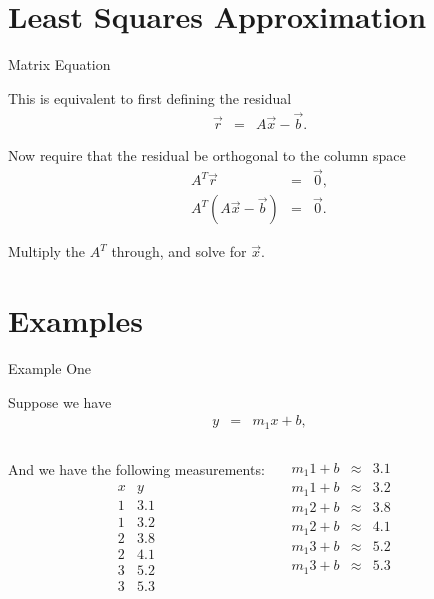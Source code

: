 \documentclass[svgnames,table,,aspectratio=169]{beamer}
\begin{document}
\section{Least Squares Approximation}

\begin{frame}{Matrix Equation}

  This is equivalent to first defining the residual
  \begin{eqnarray*}
    \vec{r} & = & A\vec{x} - \vec{b}.
  \end{eqnarray*}

  Now require that the residual be orthogonal to the column space
  \begin{eqnarray*}
    A^T \vec{r} & = & \vec{0}, \\
    A^T \left( A \vec{x} - \vec{b} \right) & = & \vec{0}.
  \end{eqnarray*}

  Multiply the $A^T$ through, and solve for $\vec{x}$.
  
\end{frame}

\section{Examples}

\begin{frame}{Example One}

  Suppose we have
  \begin{eqnarray*}
    y & = & m_1 x + b,
  \end{eqnarray*}
  
  \begin{columns}
    And we have the following measurements:
    \begin{eqnarray*}
      \begin{array}{r|r}
        x & y \\ \hline
        1 & 3.1 \\
        1 & 3.2 \\
        2 & 3.8 \\
        2 & 4.1 \\
        3 & 5.2 \\
        3 & 5.3 \\
      \end{array}
    \end{eqnarray*}


    \begin{eqnarray*}
      m_1 1 + b & \approx & 3.1 \\
      m_1 1 + b & \approx & 3.2 \\
      m_1 2 + b & \approx & 3.8 \\
      m_1 2 + b & \approx & 4.1 \\
      m_1 3 + b & \approx & 5.2 \\
      m_1 3 + b & \approx & 5.3 \\
    \end{eqnarray*}

    
  \end{columns}
\end{frame}
\end{document}
